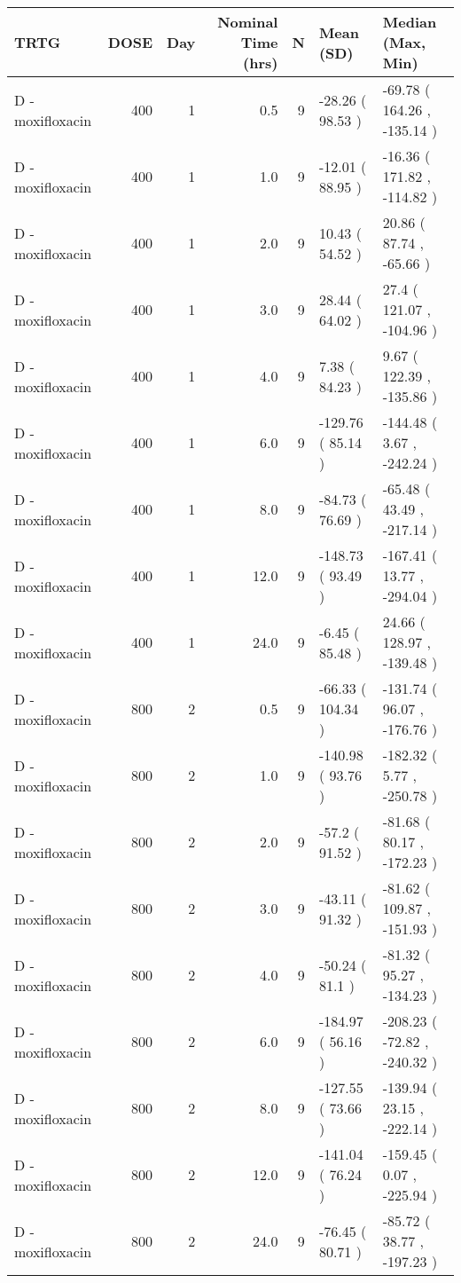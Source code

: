 
\begin{tabular}{lrrrrll}
\toprule
TRTG & DOSE & Day & Nominal Time (hrs) & N & Mean (SD) & Median (Max, Min)\\
\midrule
D - moxifloxacin & 400 & 1 & 0.5 & 9 & -28.26 ( 98.53 ) & -69.78 ( 164.26 , -135.14 )\\
D - moxifloxacin & 400 & 1 & 1.0 & 9 & -12.01 ( 88.95 ) & -16.36 ( 171.82 , -114.82 )\\
D - moxifloxacin & 400 & 1 & 2.0 & 9 & 10.43 ( 54.52 ) & 20.86 ( 87.74 , -65.66 )\\
D - moxifloxacin & 400 & 1 & 3.0 & 9 & 28.44 ( 64.02 ) & 27.4 ( 121.07 , -104.96 )\\
D - moxifloxacin & 400 & 1 & 4.0 & 9 & 7.38 ( 84.23 ) & 9.67 ( 122.39 , -135.86 )\\
D - moxifloxacin & 400 & 1 & 6.0 & 9 & -129.76 ( 85.14 ) & -144.48 ( 3.67 , -242.24 )\\
D - moxifloxacin & 400 & 1 & 8.0 & 9 & -84.73 ( 76.69 ) & -65.48 ( 43.49 , -217.14 )\\
D - moxifloxacin & 400 & 1 & 12.0 & 9 & -148.73 ( 93.49 ) & -167.41 ( 13.77 , -294.04 )\\
D - moxifloxacin & 400 & 1 & 24.0 & 9 & -6.45 ( 85.48 ) & 24.66 ( 128.97 , -139.48 )\\
D - moxifloxacin & 800 & 2 & 0.5 & 9 & -66.33 ( 104.34 ) & -131.74 ( 96.07 , -176.76 )\\
D - moxifloxacin & 800 & 2 & 1.0 & 9 & -140.98 ( 93.76 ) & -182.32 ( 5.77 , -250.78 )\\
D - moxifloxacin & 800 & 2 & 2.0 & 9 & -57.2 ( 91.52 ) & -81.68 ( 80.17 , -172.23 )\\
D - moxifloxacin & 800 & 2 & 3.0 & 9 & -43.11 ( 91.32 ) & -81.62 ( 109.87 , -151.93 )\\
D - moxifloxacin & 800 & 2 & 4.0 & 9 & -50.24 ( 81.1 ) & -81.32 ( 95.27 , -134.23 )\\
D - moxifloxacin & 800 & 2 & 6.0 & 9 & -184.97 ( 56.16 ) & -208.23 ( -72.82 , -240.32 )\\
D - moxifloxacin & 800 & 2 & 8.0 & 9 & -127.55 ( 73.66 ) & -139.94 ( 23.15 , -222.14 )\\
D - moxifloxacin & 800 & 2 & 12.0 & 9 & -141.04 ( 76.24 ) & -159.45 ( 0.07 , -225.94 )\\
D - moxifloxacin & 800 & 2 & 24.0 & 9 & -76.45 ( 80.71 ) & -85.72 ( 38.77 , -197.23 )\\
\bottomrule
\end{tabular}
